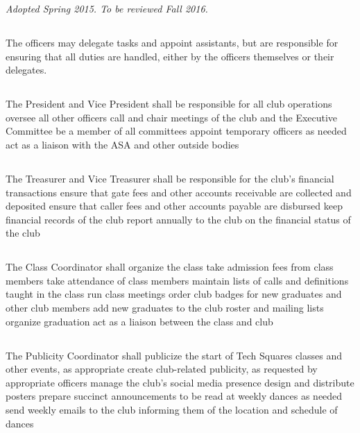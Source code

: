 \documentclass{bylaws}
\newcommand{\sptimes}[2]{\emph{Adopted #1. To be reviewed #2.}}
\begin{document}
\sptimes{Spring 2015}{Fall 2016}


\subsection{}The officers may delegate tasks and appoint assistants, but are responsible for ensuring that all duties are handled, either by the officers themselves or their delegates.

\subsection{}The President and Vice President shall
\duty be responsible for all club operations
\duty oversee all other officers
\duty call and chair meetings of the club and the Executive Committee
\duty be a member of all committees
\duty appoint temporary officers as needed
\duty act as a liaison with the ASA and other outside bodies

\subsection{}The Treasurer and Vice Treasurer shall
\duty be responsible for the club's financial transactions
\duty ensure that gate fees and other accounts receivable are collected and deposited
\duty ensure that caller fees and other accounts payable are disbursed
\duty keep financial records of the club
\duty report annually to the club on the financial status of the club

\subsection{}The Class Coordinator shall
\duty organize the class
\duty take admission fees from class members
\duty take attendance of class members
\duty maintain lists of calls and definitions taught in the class
\duty run class meetings
\duty order club badges for new graduates and other club members
\duty add new graduates to the club roster and mailing lists
\duty organize graduation
\duty act as a liaison between the class and club

\subsection{}The Publicity Coordinator shall
\duty publicize the start of Tech Squares classes and other events, as appropriate
\duty create club-related publicity, as requested by appropriate officers
\duty manage the club's social media presence
\duty design and distribute posters
\duty prepare succinct announcements to be read at weekly dances as needed
\duty send weekly emails to the club informing them of the location and schedule of dances
\end{document}
